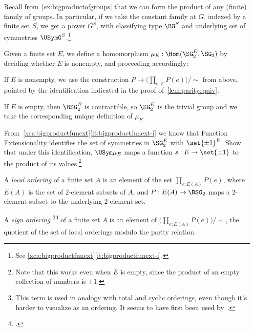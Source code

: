 Recall from~\cref{ex:bigproductofgroups} that we can form the
product of any (finite) family of groups.
In particular, if we take the constant family at $G$,
indexed by a finite set $S$, we get a power $G^S$,
with classifying type $\BG^S$ and underlying set of symmetries
$\USymG^S$.\footnote{See \cref{xca:bigproductfunext}\ref{it:bigproductfunext-i}.}

\begin{definition}\label{def:mu_E}
  Given a finite set $E$, we define a homomorphism 
  $\mu_E : \Hom(\SG_2^E,\SG_2)$ by deciding whether $E$
  is nonempty, and proceeding accordingly:

  If $E$ is nonempty, we use the construction
  $P \mapsto \bigl(\prod_{e:E}P(e)\bigr)/\sim$ from above,
  pointed by the identification indicated in the proof of~\cref{lem:parityequiv}.

  If $E$ is empty, then $\BSG_2^E$ is contractible, so $\SG_2^E$ is the trivial group
  and we take the corresponding unique definition of $\mu_E$.
\end{definition}

\begin{xca}
  From~\cref{xca:bigproductfunext}\ref{it:bigproductfunext-i}
  we know that Function Extensionality identifies the set of 
  symmetries in $\SG_2^E$ with $\set{\pm1}^E$.
  Show that under this identification, $\USym\mu_E$
  maps a function $s : E \to \set{\pm1}$
  to the product of its values.\footnote{%
    Note that this works even when $E$ is empty,
    since the product of an empty collection of numbers is $+1$.}
\end{xca}

\begin{definition}\label{def:sign-ordering}
  A \emph{local ordering} of a finite set $A$
  is an element of the set $\prod_{e:E(A)}P(e)$,
  where $E(A)$ is the set of $2$-element subsets of $A$,
  and $P : E(A) \to \BSG_2$ maps a $2$-element subset to the underlying $2$-element set.

  A \emph{sign ordering}%
  \footnote{This term is used in analogy with total and cyclic orderings,
    even though it's harder to visualize as an ordering.
    It seems to have first been used
    by~\citeauthor{Kuperberg1996}\footnotemark{}.}\footcitetext{Kuperberg1996}
  of a finite set $A$ is an element of
  $\bigl(\prod_{e:E(A)}P(e)\bigr)/\sim$,
  \ie the quotient of the set of local orderings
  modulo the parity relation.
\end{definition}

